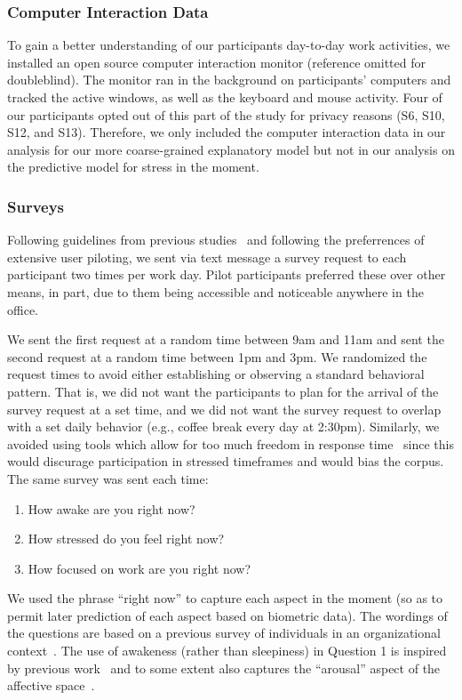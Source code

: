 \subsubsection{Computer Interaction Data}
To gain a better understanding of our participants day-to-day work activities, we installed an open source computer interaction monitor (reference omitted for doubleblind). The monitor ran in the background on participants' computers and tracked the active windows, as well as the keyboard and mouse activity. Four of our participants opted out of this part of the study for privacy reasons (S6, S10, S12, and S13). Therefore, we only included the computer interaction data in our analysis for our more coarse-grained explanatory model but not in our analysis on the predictive model for stress in the moment. 

\subsubsection{Surveys}
\label{sec:Surveys}
Following guidelines from previous studies~\cite{Lalle16,Panwar18,Luo18} and 
following the preferrences of extensive user piloting, we sent via 
text message a survey request to each participant two times per 
work day. Pilot participants preferred these over other means, in part, due 
to them being accessible and noticeable anywhere in the office. 

We sent the 
first request at a random time between 9am and 11am 
and sent the second request at a random time between 1pm and 3pm. We 
randomized the request times to avoid either establishing or observing a 
standard behavioral pattern. That is, we did not want the participants to 
plan for the arrival of the survey request at a set time, and we did not 
want the survey request to overlap with a set daily behavior (e.g., coffee 
break every day at 2:30pm). Similarly, we avoided using tools which allow 
for too much freedom in response time~\cite{Adams18} since this would 
discurage participation in stressed timeframes and would bias the 
corpus. 
The same survey was sent each time:
\begin{enumerate}
\item How awake are you right now?
\item How stressed do you feel right now?
\item How focused on work are you right now? 
\end{enumerate}
We used the phrase ``right now'' to capture each aspect in the moment (so as to permit later prediction of each aspect based on biometric data). The wordings of the questions are based on a previous survey of individuals in an organizational context~\cite{Gloor_etal:2010}. The use of awakeness (rather than sleepiness) in Question 1 is inspired by previous work~\cite{Wilhelm_Schoebi:2007} and to some extent also captures the ``arousal'' aspect of the affective space~\cite{Russell:1980}.


